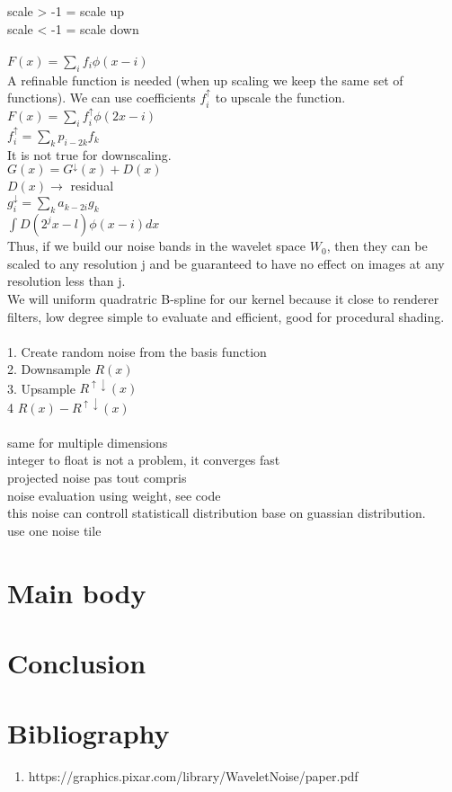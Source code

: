 \documentclass[11pt,a4paper]{article}
\begin{document}
scale > -1 = scale up\\
scale < -1 = scale down\\\\
$F(x) = \sum\limits_{i}f_i \phi(x-i)$\\
A refinable function is needed (when up scaling we keep the same set of functions).
We can use coefficients $f_i^\uparrow$ to upscale the function.\\
$F(x) = \sum\limits_{i}f_i^\uparrow \phi(2x-i)$\\
$f_i^\uparrow =\sum\limits_{k}p_{i-2k}f_k $\\
It is not true for downscaling.\\
$G(x) = G^{\downarrow}(x) + D(x)$\\
$D(x)\longrightarrow$ residual \\
$g_i^\downarrow=\sum\limits_{k}a_{k-2i}g_k $\\
$\int D(2^jx-l)\phi(x-i)dx$\\
Thus, if we build our noise bands in the wavelet space $W_0$, then they can be
scaled to any resolution j and be guaranteed to have no effect on
images at any resolution less than j.
\\
We will uniform quadratric B-spline for our kernel because it close to renderer filters, low degree simple to evaluate and efficient, good for procedural shading.\\\\
1. Create random noise from the basis function\\
2. Downsample $R(x)$\\
3. Upsample $R^{\uparrow\downarrow}(x)$\\
4  $R(x) - R^{\uparrow\downarrow}(x)$\\\\
same for multiple dimensions\\
integer to float is not a problem, it converges fast\\
projected noise pas tout compris\\
noise evaluation using weight, see code\\
this noise can controll statisticall distribution base on guassian distribution.\\
use one noise tile\\


\section{Main body}



\section{Conclusion}



\section{Bibliography}

\begin{enumerate}
\item https://graphics.pixar.com/library/WaveletNoise/paper.pdf
\end{enumerate}
\end{document}
